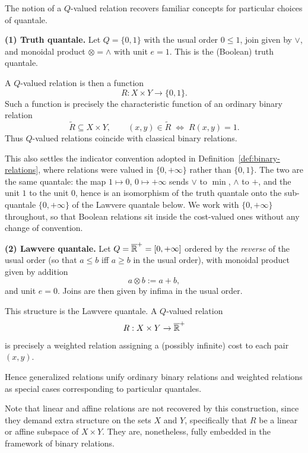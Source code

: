 \begin{example}

	The notion of a $Q$-valued relation recovers familiar concepts for particular choices of quantale.

	\medskip

	\noindent
	\textbf{(1) Truth quantale.}
	Let $Q = \{0,1\}$ with the usual order $0 \leq 1$, join given by $\lor$,
	and monoidal product $\otimes = \land$ with unit $e = 1$.
	This is the (Boolean) truth quantale.

	A $Q$-valued relation is then a function
	\[
		R : X \times Y \to \{0,1\}.
	\]
	Such a function is precisely the characteristic function of an ordinary
	binary relation
	\[
		\widetilde{R} \subseteq X \times Y,
		\qquad
		(x,y) \in \widetilde{R}
		\;\Longleftrightarrow\;
		R(x,y) = 1.
	\]
	Thus $Q$-valued relations coincide with classical binary relations.

	This also settles the indicator convention adopted in
	Definition~\ref{def:binary-relations}, where relations were valued in
	$\{0,+\infty\}$ rather than $\{0,1\}$. The two are the same quantale: the map
	$1 \mapsto 0$, $0 \mapsto +\infty$ sends $\lor$ to $\min$, $\land$ to $+$,
	and the unit $1$ to the unit $0$, hence is an isomorphism of the truth
	quantale onto the sub-quantale $\{0,+\infty\}$ of the Lawvere quantale below.
	We work with $\{0,+\infty\}$ throughout, so that Boolean relations sit inside
	the cost-valued ones without any change of convention.

	\medskip

	\noindent
	\textbf{(2) Lawvere quantale.}
	Let $Q = \overline{\mathbb{R}}^+ = [0, +\infty]$ ordered by the
	\emph{reverse} of the usual order (so that $a \leq b$ iff $a \geq b$
	in the usual order), with monoidal product given by addition
	\[
		a \otimes b := a + b,
	\]
	and unit $e = 0$. Joins are then given by infima in the usual order.

	This structure is the Lawvere quantale.
	A $Q$-valued relation
	\[
		R : X \times Y \to \overline{\mathbb{R}}^+
	\]
	is precisely a weighted relation assigning a (possibly infinite) cost
	to each pair $(x,y)$.


\end{example}
Hence generalized relations unify ordinary binary relations and
weighted relations as special cases corresponding to particular quantales.

Note that linear and affine relations are not recovered by this construction,
since they demand extra structure
on the sets $X$ and $Y$, specifically that $R$ be a linear or affine subspace of
$X \times Y$. They are, nonetheless,
fully embedded in the framework of binary relations.

